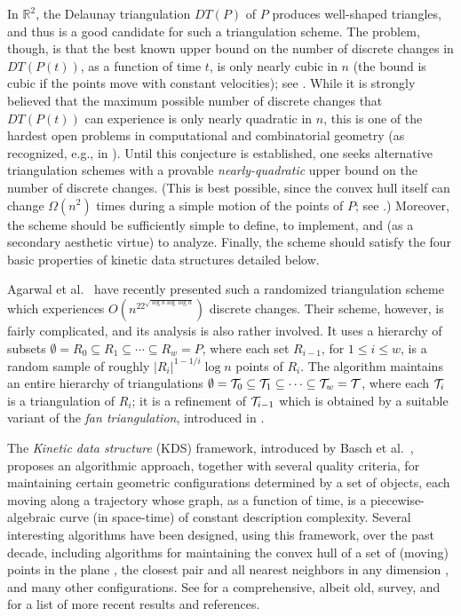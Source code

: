 \documentclass[11pt]{article}
\def\T{{\cal T}}
\def\reals{{\mathbb R}}
\begin{document}
In $\reals^2$, the Delaunay triangulation $DT(P)$ of $P$ produces well-shaped triangles, and thus 
is a good candidate for such a triangulation scheme.
The problem,
though, is that the best known upper bound on the number of 
discrete changes in $DT(P(t))$, as a function of time $t$,
is only nearly cubic in $n$ (the bound is cubic if the points move with constant velocities); see \cite{Stable,FU91,GMR91,SA:ds}. 
While it is strongly believed that the maximum possible number of 
discrete changes that $DT(P(t))$ can experience is only nearly 
quadratic in $n$, this is one of the hardest open problems in 
computational and combinatorial geometry (as recognized,
e.g., in \cite{TOPP}). 
Until this conjecture is established, one seeks alternative 
triangulation schemes with a provable \textit{nearly-quadratic} upper 
bound on the number of discrete changes. 
(This is best possible, since the convex hull itself can change $\Omega(n^2)$ times during a simple motion of the points of $P$; see \cite{SA:ds}.)
Moreover, the scheme 
should be sufficiently simple to define, to implement, and 
(as a secondary aesthetic virtue) to analyze. 
Finally, the 
scheme should satisfy the four basic properties of kinetic data 
structures \cite{BG99} detailed below.


Agarwal et al.~\cite{AWY} have recently presented such a randomized triangulation scheme which experiences
$O(n^22^{\sqrt{\log n \log\log n}})$ discrete changes. Their scheme, however, is fairly 
complicated, and its analysis is also rather involved. It uses a hierarchy of subsets $\emptyset=R_0\subseteq R_1\subseteq\cdots \subseteq R_w=P$, where each set $R_{i-1}$, for $1\leq i\leq w$, is a random sample of roughly $|R_{i}|^{1-1/i}\log n$ points of $R_{i}$. 
The algorithm maintains an entire hierarchy of triangulations $\emptyset=\T_0\subseteq \T_1\subseteq\cdots\subseteq\T_w=\T$, where each $\T_i$ is a triangulation of $R_i$; it is a refinement of $\T_{i-1}$ which is obtained by a suitable variant of the \textit{fan triangulation}, introduced in \cite{ABG}.

\medskip
{} 
The {\em Kinetic data structure\/} (KDS) framework, introduced by
Basch et al.~\cite{BG99}, proposes an algorithmic
approach, together with several quality criteria, for maintaining
certain geometric configurations determined by a set of objects,
each moving along a trajectory whose graph, as a function of time,
is a piecewise-algebraic curve (in space-time) of constant description complexity.
Several interesting algorithms have been designed, using this
framework, over the past decade, including algorithms for
maintaining the convex hull of a set of (moving) points in the
plane \cite{BG99}, the closest pair and all nearest neighbors
in any dimension \cite{AgKS,BG99}, and many other configurations. 
See \cite{Gui} for a comprehensive, albeit old, survey, and \cite{AgKS}
for a list of more recent results and references.
\end{document}

